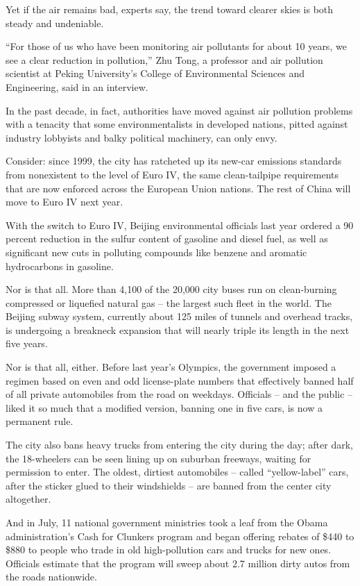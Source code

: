 ﻿\documentclass[12pt]{article}
\begin{document}
Yet if the air remains bad, experts say, the trend toward clearer skies is both steady and
undeniable.

``For those of us who have been monitoring air pollutants for about 10 years, we see a clear
reduction in pollution,'' Zhu Tong, a professor and air pollution scientist at Peking University's
College of Environmental Sciences and Engineering, said in an interview.

In the past decade, in fact, authorities have moved against air pollution problems with a tenacity
that some environmentalists in developed nations, pitted against industry lobbyists and balky
political machinery, can only envy\cite{envy}.

Consider: since 1999, the city has ratcheted up its new-car emissions standards from nonexistent to
the level of Euro IV, the same clean-tailpipe requirements that are now enforced across the European
Union nations. The rest of China will move to Euro IV next year.

With the switch to Euro IV, Beijing environmental officials last year ordered a 90 percent reduction
in the sulfur content of gasoline and diesel fuel, as well as significant new cuts in polluting
compounds like benzene and aromatic hydrocarbons in gasoline.

Nor is that all. More than 4,100 of the 20,000 city buses run on clean-burning compressed or
liquefied natural gas -- the largest such fleet in the world. The Beijing subway system, currently
about 125 miles of tunnels and overhead tracks, is undergoing a breakneck expansion that will nearly
triple its length in the next five years.

Nor is that all, either. Before last year's Olympics, the government imposed a regimen based on even
and odd license-plate numbers that effectively banned half of all private automobiles from the road
on weekdays. Officials -- and the public -- liked it so much that a modified version, banning one in
five cars, is now a permanent rule.

The city also bans heavy trucks from entering the city during the day; after dark, the 18-wheelers
can be seen lining up on suburban freeways, waiting for permission to enter. The oldest, dirtiest
automobiles -- called ``yellow-label'' cars, after the sticker glued to their windshields -- are
banned from the center city altogether.

And in July, 11 national government ministries took a leaf from the Obama administration's Cash for
Clunkers program and began offering rebates of \$440 to \$880 to people who trade in old
high-pollution cars and trucks for new ones. Officials estimate that the program will sweep about
2.7 million dirty autos from the roads nationwide.
\end{document}
